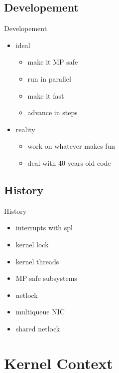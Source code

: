 \documentclass[14pt,aspectratio=169]{beamer}
\begin{document}
\subsection{Developement}
\begin{frame}{Developement}
\begin{itemize}
\item ideal
    \begin{itemize}
    \item make it MP safe
    \item run in parallel
    \item make it fast
    \item advance in steps
    \end{itemize}
\item reality
    \begin{itemize}
    \item work on whatever makes fun
    \item deal with 40 years old code
    \end{itemize}
\end{itemize}
\end{frame}

\subsection{History}
\begin{frame}{History}
\begin{itemize}
\item interrupts with spl
\item kernel lock
\item kernel threads
\item MP safe subsystems
\item netlock
\item multiqueue NIC
\item shared netlock
\end{itemize}
\end{frame}

\section{Kernel Context}
\end{document}
